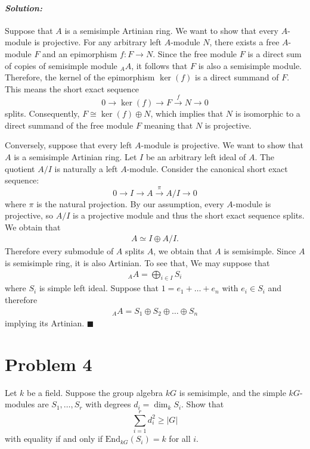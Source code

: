 \documentclass[12pt, a4paper]{article}
\theoremstyle{remark}
\newenvironment{solution}
  {\paragraph{\textit{Solution:}}\par\medskip}
  {\hfill$\blacksquare$\vspace{0.1cm}}
\begin{document}
\begin{solution}
   Suppose that $A$ is a semisimple Artinian ring. We want to show that every $A$-module is projective.
    For any arbitrary left $A$-module $N$, there exists a free $A$-module $F$ and an epimorphism $f: F \to N$. 
    Since the free module $F$ is a direct sum of copies of semisimple module $_A A$, it follows that $F$ is also a semisimple module. 
    Therefore, the kernel of the epimorphism $\ker(f)$ is a direct summand of $F$. This means the short exact sequence 
$$ 0 \to \ker(f) \to F \xrightarrow{f} N \to 0 $$
splits. Consequently, $F \cong \ker(f) \oplus N$, which implies that $N$ is isomorphic to a direct summand of the free module $F$ meaning that $N$ is projective.

Conversely, suppose that every left $A$-module is projective. We want to show that $A$ is a semisimple Artinian ring.
Let $I$ be an arbitrary left ideal of $A$. The quotient $A/I$ is naturally a left $A$-module. Consider the canonical short exact sequence:
$$ 0 \to I \to A \xrightarrow{\pi} A/I \to 0 $$
where $\pi$ is the natural projection. By our assumption, every $A$-module is projective, so $A/I$ is a projective module 
and thus the short exact sequence splits. We obtain that 
\begin{align*}
    A \simeq I \oplus A/I.
\end{align*}
Therefore every submodule of $A$ splits $A$, we obtain that $A$ is semisimple. Since $A$ is semisimple ring, it is also Artinian. To see that, We may suppose that 
\begin{align*}
   _A A = \bigoplus_{i \in I} S_i
\end{align*} 
where $S_i$ is simple left ideal. Suppose that $1=e_1+\dots+e_n$ with $e_i\in S_i$ and therefore
\begin{align*}
    _A A = S_1 \oplus S_2 \oplus \dots \oplus S_n
\end{align*}
implying its Artinian.
\end{solution}


\section*{Problem 4}

Let $k$ be a field. Suppose the group algebra $kG$ is semisimple, and the simple $kG$-modules are $S_1, \dots, S_r$ with degrees $d_i = \dim_k S_i$. Show that
\[ \sum_{i=1}^{r} d_i^2 \geq |G| \]
with equality if and only if $\text{End}_{kG}(S_i) = k$ for all $i$.
\end{document}
